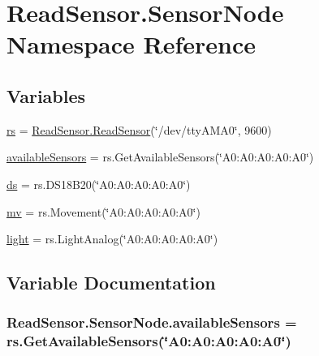 \hypertarget{namespaceReadSensor_1_1SensorNode}{}\section{Read\+Sensor.\+Sensor\+Node Namespace Reference}
\label{namespaceReadSensor_1_1SensorNode}
\subsection*{Variables}
\begin{DoxyCompactItemize}
\item 
\hyperlink{namespaceReadSensor_1_1SensorNode_aab4130f05e0d383004da4b2199def54d}{rs} = \hyperlink{classReadSensor_1_1ReadSensor_1_1ReadSensor}{Read\+Sensor.\+Read\+Sensor}(\char`\"{}/dev/tty\+A\+M\+A0\char`\"{}, 9600)
\item 
\hyperlink{namespaceReadSensor_1_1SensorNode_ab825456060046c46088453e242844a67}{available\+Sensors} = rs.\+Get\+Available\+Sensors(\char`\"{}A0\+:\+A0\+:\+A0\+:\+A0\+:\+A0\char`\"{})
\item 
\hyperlink{namespaceReadSensor_1_1SensorNode_a8171a151bb4b0ae935ff538ce6791944}{ds} = rs.\+D\+S18\+B20(\char`\"{}A0\+:\+A0\+:\+A0\+:\+A0\+:\+A0\char`\"{})
\item 
\hyperlink{namespaceReadSensor_1_1SensorNode_a6554f3410cedc47453c44dffec450d82}{mv} = rs.\+Movement(\char`\"{}A0\+:\+A0\+:\+A0\+:\+A0\+:\+A0\char`\"{})
\item 
\hyperlink{namespaceReadSensor_1_1SensorNode_aaf373686eec11b55f9271c70d083bd70}{light} = rs.\+Light\+Analog(\char`\"{}A0\+:\+A0\+:\+A0\+:\+A0\+:\+A0\char`\"{})
\end{DoxyCompactItemize}


\subsection{Variable Documentation}
\subsubsection[{\texorpdfstring{available\+Sensors}{availableSensors}}]{\setlength{\rightskip}{0pt plus 5cm}Read\+Sensor.\+Sensor\+Node.\+available\+Sensors = rs.\+Get\+Available\+Sensors(\char`\"{}A0\+:\+A0\+:\+A0\+:\+A0\+:\+A0\char`\"{})}\hypertarget{namespaceReadSensor_1_1SensorNode_ab825456060046c46088453e242844a67}{}\label{namespaceReadSensor_1_1SensorNode_ab825456060046c46088453e242844a67}
